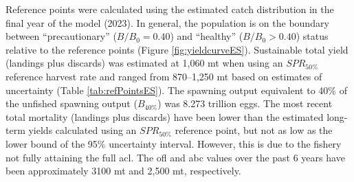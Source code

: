 \documentclass[11pt,
  english,
  letterpaper,
]{article}
\begin{document}
Reference points were calculated using the estimated catch distribution in the final year of the model (2023). In general, the population is on the boundary between ``precautionary'' (\(B/B_0 = 0.40\)) and ``healthy'' (\(B/B_0 > 0.40\)) status relative to the reference points (Figure \ref{fig:yieldcurveES}). Sustainable total yield (landings plus discards) was estimated at 1,060 mt when using an \(SPR_{50\%}\) reference harvest rate and ranged from 870--1,250 mt based on estimates of uncertainty (Table \ref{tab:refPointsES}). The spawning output equivalent to 40\% of the unfished spawning output (\(B_{40\%}\)) was 8.273 trillion eggs. The most recent total mortality (landings plus discards) have been lower than the estimated long-term yields calculated using an \(SPR_{50\%}\) reference point, but not as low as the lower bound of the 95\% uncertainty interval. However, this is due to the fishery not fully attaining the full \gls{acl}. The \gls{ofl} and \gls{abc} values over the past 6 years have been approximately 3100 mt and 2,500 mt, respectively.

\begingroup\fontsize{10}{12}\selectfont
\begingroup\fontsize{10}{12}\selectfont
\end{document}
